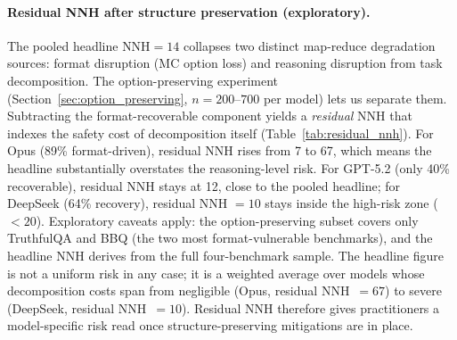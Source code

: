 
\paragraph{Residual NNH after structure preservation (exploratory).}
The pooled headline $\text{NNH} = 14$ collapses two distinct map-reduce degradation sources: format disruption (MC option loss) and reasoning disruption from task decomposition.  The option-preserving experiment (Section~\ref{sec:option_preserving}, $n = 200$--$700$ per model) lets us separate them.  Subtracting the format-recoverable component yields a \emph{residual} NNH that indexes the safety cost of decomposition itself (Table~\ref{tab:residual_nnh}).  For Opus (89\% format-driven), residual NNH rises from 7 to 67, which means the headline substantially overstates the reasoning-level risk.  For GPT-5.2 (only 40\% recoverable), residual NNH stays at 12, close to the pooled headline; for DeepSeek (64\% recovery), residual NNH $= 10$ stays inside the high-risk zone ($< 20$).  Exploratory caveats apply: the option-preserving subset covers only TruthfulQA and BBQ (the two most format-vulnerable benchmarks), and the headline NNH derives from the full four-benchmark sample.  The headline figure is not a uniform risk in any case; it is a weighted average over models whose decomposition costs span from negligible (Opus, residual NNH~$= 67$) to severe (DeepSeek, residual NNH~$= 10$).  Residual NNH therefore gives practitioners a model-specific risk read once structure-preserving mitigations are in place.
